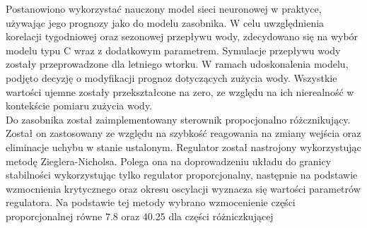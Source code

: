 \documentclass[a4paper,twoside,12pt]{book}
\begin{document}
Postanowiono wykorzystać nauczony model sieci neuronowej w praktyce, używając jego prognozy jako do modelu zasobnika. W celu uwzględnienia korelacji tygodniowej oraz sezonowej przepływu wody, zdecydowano się na wybór modelu typu C wraz z dodatkowym parametrem. Symulacje przepływu wody zostały przeprowadzone dla letniego wtorku. W ramach udoskonalenia modelu, podjęto decyzję o modyfikacji prognoz dotyczących zużycia wody. Wszystkie wartości ujemne zostały przekształcone na zero, ze względu na ich nierealność w kontekście pomiaru zużycia wody.\\

Do zasobnika został zaimplementowany sterownik propocjonalno różcznikujący. Został on zastosowany ze względu na szybkość reagowania na zmiany wejścia oraz eliminacje uchybu w stanie ustalonym. Regulator został nastrojony wykorzystując metodę Zieglera-Nicholsa. Polega ona na doprowadzeniu układu do granicy stabilności wykorzystując tylko regulator proporcjonalny, następnie na podstawie wzmocnienia krytycznego oraz okresu oscylacji wyznacza się wartości parametrów regulatora. Na podstawie tej metody wybrano wzmocenienie części proporcjonalnej równe 7.8 oraz 40.25 dla części różniczkującej
\end{document}
